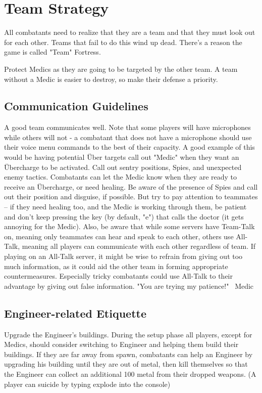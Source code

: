 \section{Team Strategy}
\label{Team_Strategy}
All combatants need to realize that they are a team and that they must look out for each other. Teams that fail to do this wind up dead. There's a reason the game is called "Team" Fortress.

Protect Medics as they are going to be targeted by the other team. A team without a Medic is easier to destroy, so make their defense a priority.

\subsection{Communication Guidelines}
A good team communicates well. Note that some players will have microphones while others will not - a combatant that does not have a microphone should use their voice menu commands to the best of their capacity. A good example of this would be having potential Über targets call out "Medic" when they want an Übercharge to be activated. Call out sentry positions, Spies, and unexpected enemy tactics.  Combatants can let the Medic know when they are ready to receive an Übercharge, or need healing. Be aware of the presence of Spies and call out their position and disguise, if possible. But try to pay attention to teammates -- if they need healing too, and the Medic is working through them, be patient and don't keep pressing the key (by default, "e") that calls the doctor (it gets annoying for the Medic).  Also, be aware that while some servers have Team-Talk on, meaning only teammates can hear and speak to each other, others use All-Talk, meaning all players can communicate with each other regardless of team.  If playing on an All-Talk server, it might be wise to refrain from giving out too much information, as it could aid the other team in forming appropriate countermeasures.  Especially tricky combatants could use All-Talk to their advantage by giving out false information.
"You are trying my patience!" ~Medic

\subsection{Engineer-related Etiquette}
Upgrade the Engineer's buildings.  During the setup phase all players, except for Medics, should consider switching to Engineer and helping them build their buildings. If they are far away from spawn, combatants can help an Engineer by upgrading his building until they are out of metal, then kill
themselves so that the Engineer can collect an additional 100 metal from their dropped weapons. (A player can suicide by typing explode into the console)

